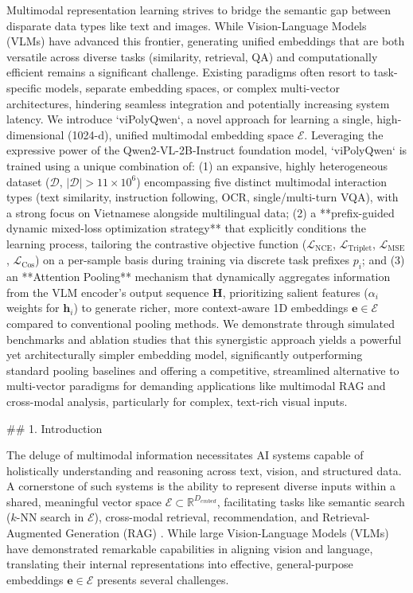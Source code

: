 Multimodal representation learning strives to bridge the semantic gap between disparate data types like text and images. While Vision-Language Models (VLMs) have advanced this frontier, generating unified embeddings that are both versatile across diverse tasks (similarity, retrieval, QA) and computationally efficient remains a significant challenge. Existing paradigms often resort to task-specific models, separate embedding spaces, or complex multi-vector architectures, hindering seamless integration and potentially increasing system latency. We introduce `viPolyQwen`, a novel approach for learning a single, high-dimensional (1024-d), unified multimodal embedding space $\mathcal{E}$. Leveraging the expressive power of the Qwen2-VL-2B-Instruct foundation model, `viPolyQwen` is trained using a unique combination of: (1) an expansive, highly heterogeneous dataset ($\mathcal{D}$, $|\mathcal{D}| > 11 \times 10^6$) encompassing five distinct multimodal interaction types (text similarity, instruction following, OCR, single/multi-turn VQA), with a strong focus on Vietnamese alongside multilingual data; (2) a **prefix-guided dynamic mixed-loss optimization strategy** that explicitly conditions the learning process, tailoring the contrastive objective function ($\mathcal{L}_{\text{NCE}}$, $\mathcal{L}_{\text{Triplet}}$, $\mathcal{L}_{\text{MSE}}$, $\mathcal{L}_{\text{Cos}}$) on a per-sample basis during training via discrete task prefixes $p_i$; and (3) an **Attention Pooling** mechanism that dynamically aggregates information from the VLM encoder's output sequence $\mathbf{H}$, prioritizing salient features ($\alpha_i$ weights for $\mathbf{h}_i$) to generate richer, more context-aware 1D embeddings $\mathbf{e} \in \mathcal{E}$ compared to conventional pooling methods. We demonstrate through simulated benchmarks and ablation studies that this synergistic approach yields a powerful yet architecturally simpler embedding model, significantly outperforming standard pooling baselines and offering a competitive, streamlined alternative to multi-vector paradigms for demanding applications like multimodal RAG and cross-modal analysis, particularly for complex, text-rich visual inputs.

## 1. Introduction

The deluge of multimodal information necessitates AI systems capable of holistically understanding and reasoning across text, vision, and structured data. A cornerstone of such systems is the ability to represent diverse inputs within a shared, meaningful vector space $\mathcal{E} \subset \mathbb{R}^{D_{embed}}$, facilitating tasks like semantic search ($k$-NN search in $\mathcal{E}$), cross-modal retrieval, recommendation, and Retrieval-Augmented Generation (RAG) \cite{lewis2020retrieval}. While large Vision-Language Models (VLMs) \cite{radford2021learning, bai2023qwen, alayrac2022flamingo} have demonstrated remarkable capabilities in aligning vision and language, translating their internal representations into effective, general-purpose embeddings $\mathbf{e} \in \mathcal{E}$ presents several challenges.

